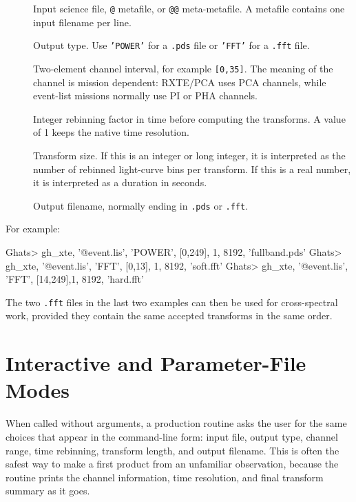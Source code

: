 \begin{description}
\item[] Input science file, \texttt{@} metafile, or
  \texttt{@@} meta-metafile.  A metafile contains one input filename per line.
\item[] Output type.  Use \texttt{'POWER'} for a
  \texttt{.pds} file or \texttt{'FFT'} for a \texttt{.fft} file.
\item[] Two-element channel interval, for example
  \texttt{[0,35]}.  The meaning of the channel is mission dependent: RXTE/PCA
  uses PCA channels, while event-list missions normally use PI or PHA channels.
\item[] Integer rebinning factor in time before computing the
  transforms.  A value of 1 keeps the native time resolution.
\item[] Transform size.  If this is an integer or long integer,
  it is interpreted as the number of rebinned light-curve bins per transform.
  If this is a real number, it is interpreted as a duration in seconds.
\item[] Output filename, normally ending in \texttt{.pds} or
  \texttt{.fft}.
\end{description}

For example:

\begin{ghatsconsole}
Ghats> gh_xte, '@event.lis', 'POWER', [0,249], 1, 8192, 'fullband.pds'
Ghats> gh_xte, '@event.lis', 'FFT',   [0,13],  1, 8192, 'soft.fft'
Ghats> gh_xte, '@event.lis', 'FFT',   [14,249],1, 8192, 'hard.fft'
\end{ghatsconsole}

The two \texttt{.fft} files in the last two examples can then be used for
cross-spectral work, provided they contain the same accepted transforms in the
same order.

\section{Interactive and Parameter-File Modes}

When called without arguments, a production routine asks the user for the same
choices that appear in the command-line form: input file, output type, channel
range, time rebinning, transform length, and output filename.  This is often
the safest way to make a first product from an unfamiliar observation, because
the routine prints the channel information, time resolution, and final
transform summary as it goes.

